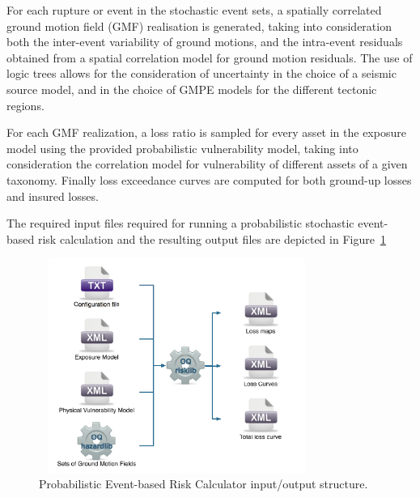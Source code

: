 For each rupture or event in the stochastic event sets, a spatially correlated
ground motion field (GMF) realisation is generated, taking into consideration
both the inter-event variability of ground motions, and the intra-event
residuals obtained from a spatial correlation model for ground motion
residuals. The use of logic trees allows for the consideration of uncertainty
in the choice of a seismic source model, and in the choice of GMPE models for the
different tectonic regions.

For each GMF realization, a loss ratio is sampled for every asset in the
exposure model using the provided probabilistic vulnerability model, taking
into consideration the correlation model for vulnerability of different assets
of a given taxonomy. Finally loss exceedance curves are computed for both
ground-up losses and insured losses.

The required input files required for running a probabilistic stochastic
event-based risk calculation and the resulting output files are depicted in
Figure~\ref{fig:io-structure-event-based-risk}

\begin{figure}[ht]
\centering
\includegraphics[width=9cm,height=7cm]{figures/risk/io-structure-event-based-risk.pdf}
\caption{Probabilistic Event-based Risk Calculator input/output structure.}
\label{fig:io-structure-event-based-risk}
\end{figure}
